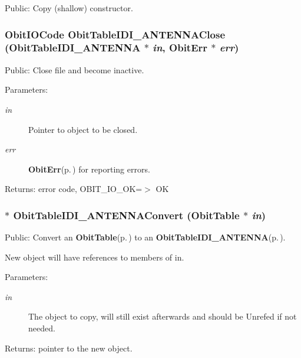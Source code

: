 Public: Copy (shallow) constructor. 

\subsubsection{\setlength{\rightskip}{0pt plus 5cm}Obit\-IOCode Obit\-Table\-IDI\_\-ANTENNAClose ({\bf Obit\-Table\-IDI\_\-ANTENNA} $\ast$ {\em in}, {\bf Obit\-Err} $\ast$ {\em err})}\label{ObitTableIDI__ANTENNA_8h_a21}


Public: Close file and become inactive. 

\begin{Desc}
\item[Parameters:]
\begin{description}
\item[{\em in}]Pointer to object to be closed. \item[{\em err}]{\bf Obit\-Err}{\rm (p.\,\pageref{structObitErr})} for reporting errors. \end{description}
\end{Desc}
\begin{Desc}
\item[Returns:]error code, OBIT\_\-IO\_\-OK=$>$ OK \end{Desc}
\subsubsection{$\ast$ Obit\-Table\-IDI\_\-ANTENNAConvert ({\bf Obit\-Table} $\ast$ {\em in})}\label{ObitTableIDI__ANTENNA_8h_a16}


Public: Convert an {\bf Obit\-Table}{\rm (p.\,\pageref{structObitTable})} to an {\bf Obit\-Table\-IDI\_\-ANTENNA}{\rm (p.\,\pageref{structObitTableIDI__ANTENNA})}. 

New object will have references to members of in. \begin{Desc}
\item[Parameters:]
\begin{description}
\item[{\em in}]The object to copy, will still exist afterwards and should be Unrefed if not needed. \end{description}
\end{Desc}
\begin{Desc}
\item[Returns:]pointer to the new object. \end{Desc}
